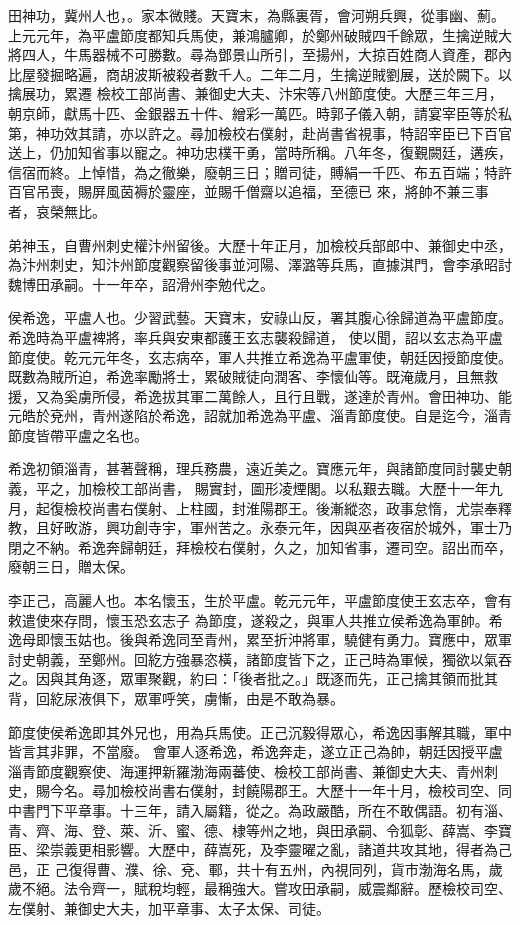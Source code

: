 \begin{pinyinscope}
 田神功，冀州人也，。家本微賤。天寶末，為縣裏胥，會河朔兵興，從事幽、薊。上元元年，為平盧節度都知兵馬使，兼鴻臚卿，於鄭州破賊四千餘眾，生擒逆賊大將四人，牛馬器械不可勝數。尋為鄧景山所引，至揚州，大掠百姓商人資產，郡內比屋發掘略遍，商胡波斯被殺者數千人。二年二月，生擒逆賊劉展，送於闕下。以擒展功，累遷
 檢校工部尚書、兼御史大夫、汴宋等八州節度使。大歷三年三月，朝京師，獻馬十匹、金銀器五十件、繒彩一萬匹。時郭子儀入朝，請宴宰臣等於私第，神功效其請，亦以許之。尋加檢校右僕射，赴尚書省視事，特詔宰臣已下百官送上，仍加知省事以寵之。神功忠樸干勇，當時所稱。八年冬，復覲闕廷，遘疾，信宿而終。上悼惜，為之徹樂，廢朝三日；贈司徒，賻絹一千匹、布五百端；特許百官吊喪，賜屏風茵褥於靈座，並賜千僧齋以追福，至德已
 來，將帥不兼三事者，哀榮無比。



 弟神玉，自曹州刺史權汴州留後。大歷十年正月，加檢校兵部郎中、兼御史中丞，為汴州刺史，知汴州節度觀察留後事並河陽、澤潞等兵馬，直據淇門，會李承昭討魏博田承嗣。十一年卒，詔滑州李勉代之。



 侯希逸，平盧人也。少習武藝。天寶末，安祿山反，署其腹心徐歸道為平盧節度。希逸時為平盧裨將，率兵與安東都護王玄志襲殺歸道，
 使以聞，詔以玄志為平盧節度使。乾元元年冬，玄志病卒，軍人共推立希逸為平盧軍使，朝廷因授節度使。既數為賊所迫，希逸率勵將士，累破賊徒向潤客、李懷仙等。既淹歲月，且無救援，又為奚虜所侵，希逸拔其軍二萬餘人，且行且戰，遂達於青州。會田神功、能元皓於兗州，青州遂陷於希逸，詔就加希逸為平盧、淄青節度使。自是迄今，淄青節度皆帶平盧之名也。



 希逸初領淄青，甚著聲稱，理兵務農，遠近美之。寶應元年，與諸節度同討襲史朝義，平之，加檢校工部尚書，
 賜實封，圖形凌煙閣。以私艱去職。大歷十一年九月，起復檢校尚書右僕射、上柱國，封淮陽郡王。後漸縱恣，政事怠惰，尤崇奉釋教，且好畋游，興功創寺宇，軍州苦之。永泰元年，因與巫者夜宿於城外，軍士乃閉之不納。希逸奔歸朝廷，拜檢校右僕射，久之，加知省事，遷司空。詔出而卒，廢朝三日，贈太保。



 李正己，高麗人也。本名懷玉，生於平盧。乾元元年，平盧節度使王玄志卒，會有敕遣使來存問，懷玉恐玄志子
 為節度，遂殺之，與軍人共推立侯希逸為軍帥。希逸母即懷玉姑也。後與希逸同至青州，累至折沖將軍，驍健有勇力。寶應中，眾軍討史朝義，至鄭州。回紇方強暴恣橫，諸節度皆下之，正己時為軍候，獨欲以氣吞之。因與其角逐，眾軍聚觀，約曰：「後者批之。」既逐而先，正己擒其領而批其背，回紇尿液俱下，眾軍呼笑，虜慚，由是不敢為暴。



 節度使侯希逸即其外兄也，用為兵馬使。正己沉毅得眾心，希逸因事解其職，軍中皆言其非罪，不當廢。
 會軍人逐希逸，希逸奔走，遂立正己為帥，朝廷因授平盧淄青節度觀察使、海運押新羅渤海兩蕃使、檢校工部尚書、兼御史大夫、青州刺史，賜今名。尋加檢校尚書右僕射，封饒陽郡王。大歷十一年十月，檢校司空、同中書門下平章事。十三年，請入屬籍，從之。為政嚴酷，所在不敢偶語。初有淄、青、齊、海、登、萊、沂、蜜、德、棣等州之地，與田承嗣、令狐彰、薛嵩、李寶臣、梁崇義更相影響。大歷中，薛嵩死，及李靈曜之亂，諸道共攻其地，得者為己邑，正
 己復得曹、濮、徐、兗、鄆，共十有五州，內視同列，貨市渤海名馬，歲歲不絕。法令齊一，賦稅均輕，最稱強大。嘗攻田承嗣，威震鄰辭。歷檢校司空、左僕射、兼御史大夫，加平章事、太子太保、司徒。




\end{pinyinscope}
